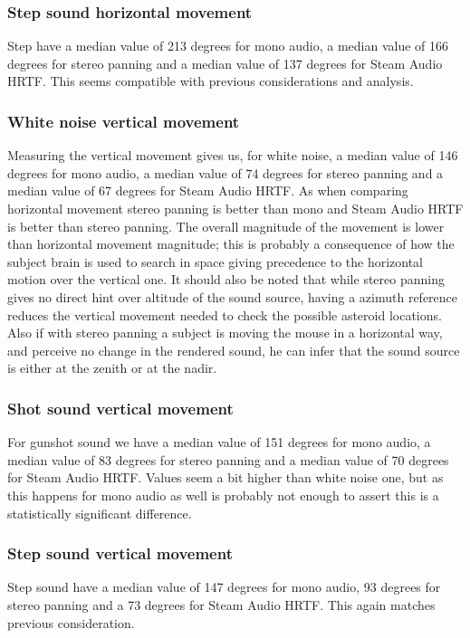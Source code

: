 \documentclass[conference]{IEEEtran}
\begin{document}
\subsubsection{Step sound horizontal movement}
Step have a median value of 213 degrees for mono audio, a median value of 166 degrees for stereo panning and a median value of 137 degrees for Steam Audio HRTF. This seems compatible with previous considerations and analysis.\\

\subsubsection{White noise vertical movement}
Measuring the vertical movement gives us, for white noise, a median value of 146 degrees for mono audio, a median value of 74 degrees for stereo panning and a median value of 67 degrees for Steam Audio HRTF.
As when comparing horizontal movement stereo panning is better than mono and Steam Audio HRTF is better than stereo panning. The overall magnitude of the movement is lower than horizontal movement magnitude; this is probably a consequence of how the subject brain is used to search in space giving precedence to the horizontal motion over the vertical one.
It should also be noted that while stereo panning gives no direct hint over altitude of the sound source, having a azimuth reference reduces the vertical movement needed to check the possible asteroid locations. Also if with stereo panning a subject is moving the mouse in a horizontal way, and perceive no change in the rendered sound, he can infer that the sound source is either at the zenith or at the nadir.\\

\subsubsection{Shot sound vertical movement}
For gunshot sound we have a median value of 151 degrees for mono audio, a median value of 83 degrees for stereo panning and a median value of 70 degrees for Steam Audio HRTF. Values seem a bit higher than white noise one, but as this happens for mono audio as well is probably not enough to assert this is a statistically significant difference.\\

\subsubsection{Step sound vertical movement}
Step sound have a median value of 147 degrees for mono audio, 93 degrees for stereo panning and a 73 degrees for Steam Audio HRTF. This again matches previous consideration.\\
\end{document}
